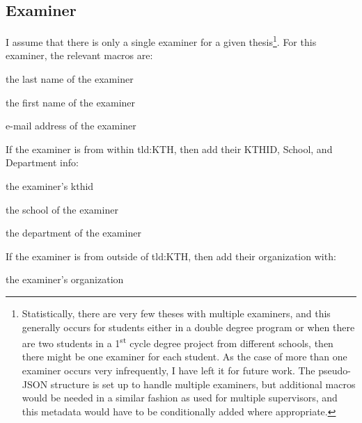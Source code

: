 \subsection{Examiner}
\label{sec:examinerMacros}
I assume that there is only a single examiner for a given thesis\footnote{Statistically, there are very few theses with multiple examiners, and this generally occurs for students either in a double degree program or when there are two students in a 1\textsuperscript{st} cycle degree project from different schools, then there might be one examiner for each student. As the case of more than one examiner occurs very infrequently, I have left it for future work. The pseudo-JSON structure is set up to handle multiple examiners, but additional macros would be needed in a similar fashion as used for multiple supervisors, and this metadata would have to be conditionally added where appropriate.}. For this examiner, the relevant macros are:
\begin{description}[leftmargin=!, labelwidth =\widthof{\texttt{\textbackslash secondAuthorsFirstname\{\}}}]
\item [\texttt{\textbackslash examinersLastname\{\}}] the last name of the examiner
\item [\texttt{\textbackslash examinersFirstname\{\}}] the first name of the examiner
\item [\texttt{\textbackslash examinersEmail\{\}}] e-mail address of the examiner
\end{description}

If the examiner is from within \gls{tld:KTH}, then add their KTHID, School, and Department info:
\begin{description}[leftmargin=!, labelwidth =\widthof{\texttt{\textbackslash secondAuthorsFirstname\{\}}}]
\item [\texttt{\textbackslash examinersKTHID\{\}}] the examiner's kthid 
\item [\texttt{\textbackslash examinersSchool\{\}}] the school of the examiner
\item [\texttt{\textbackslash examinersDepartment\{\}}] the department of the examiner
\end{description}

If the examiner is from outside of \gls{tld:KTH}, then add their organization with:
\begin{description}[leftmargin=!, labelwidth =\widthof{\texttt{\textbackslash secondAuthorsFirstname\{\}}}]
\item [\texttt{\textbackslash examinersOrganization\{\}}] the examiner's organization
\end{description}


